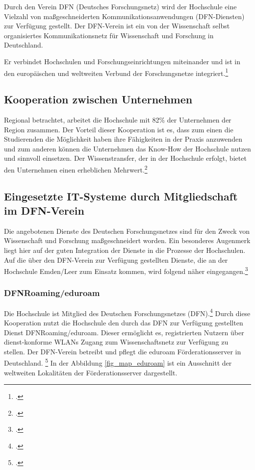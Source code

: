 Durch den Verein DFN (Deutsches Forschungsnetz) wird der Hochschule eine Vielzahl von maßgeschneiderten Kommunikationsanwendungen (DFN-Diensten) zur Verfügung gestellt. Der DFN-Verein ist ein von der Wissenschaft selbst organisiertes Kommunikationsnetz für Wissenschaft und Forschung in Deutschland. 

Er verbindet Hochschulen und Forschungseinrichtungen miteinander und ist in den europäischen und weltweiten  Verbund der Forschungsnetze integriert.\footcite[Vgl.][]{dfn_home_2015}

\subsection{Kooperation zwischen Unternehmen}
Regional betrachtet, arbeitet die Hochschule mit 82\% der Unternehmen der Region zusammen. Der Vorteil dieser Kooperation ist es, dass zum einen die Studierenden die Möglichkeit haben ihre Fähigkeiten in der Praxis anzuwenden und zum anderen können die Unternehmen das Know-How  der Hochschule nutzen und sinnvoll einsetzen. Der Wissenstransfer, der in der Hochschule erfolgt, bietet den Unternehmen einen erheblichen Mehrwert.\footcite[Vgl.][]{hsel_artikel_kooperation_unternehmen_2014}

\subsection{Eingesetzte IT-Systeme durch Mitgliedschaft im DFN-Verein}
Die angebotenen Dienste des Deutschen Forschungsnetzes sind für den Zweck von Wissenschaft und Forschung maßgeschneidert worden. Ein besonderes Augenmerk liegt hier auf der guten Integration der Dienste in die Prozesse der Hochschulen.  Auf die über den DFN-Verein zur Verfügung gestellten Dienste, die an der Hochschule Emden/Leer zum Einsatz kommen, wird folgend näher eingegangen.\footcite[Vgl.][]{dfn_dienste_2014}

\subsubsection{DFNRoaming/eduroam}
Die Hochschule ist Mitglied des Deutschen Forschungsnetzes (DFN).\footcite{dfn_mitgleider_2012} Durch diese Kooperation nutzt die Hochschule den durch das DFN zur Verfügung gestellten Dienst DFNRoaming/eduroam. Dieser ermöglicht es, registrierten Nutzern über dienst-konforme WLANs Zugang zum Wissenschaftsnetz zur Verfügung zu stellen. Der DFN-Verein betreibt und pflegt die eduroam Förderationsserver in Deutschland. \footcite[Vgl.][]{dfn_roaming_2015} 
\clearpage
In der Abbildung \ref{fig_map_eduroam} ist ein Ausschnitt der weltweiten Lokalitäten der Förderationsserver dargestellt.

